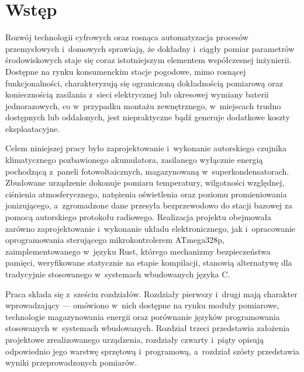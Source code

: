 \documentclass[a4paper,12pt]{book} %
\renewcommand{\chaptermark}[1]{\markboth{#1}{}}
\begin{document}


\sloppy

\thispagestyle{empty}

\newpage{}



\thispagestyle{empty}

\newpage{}



\tableofcontents{}

\chapter*{Wstęp} %
\chaptermark{Wstęp} %

Rozwój technologii cyfrowych oraz rosnąca automatyzacja procesów
przemysłowych i~domowych sprawiają, że dokładny i~ciągły pomiar
parametrów środowiskowych staje się coraz istotniejszym elementem
współczesnej inżynierii. Dostępne na rynku konsumenckim stacje pogodowe,
mimo rosnącej funkcjonalności, charakteryzują się ograniczoną dokładnością
pomiarową oraz koniecznością zasilania z~sieci elektrycznej lub okresowej
wymiany baterii jednorazowych, co w~przypadku montażu zewnętrznego,
w~miejscach trudno dostępnych lub oddalonych, jest niepraktyczne bądź
generuje dodatkowe koszty eksploatacyjne.
 
Celem niniejszej pracy było zaprojektowanie i~wykonanie autorskiego
czujnika klimatycznego pozbawionego akumulatora, zasilanego wyłącznie
energią pochodzącą z~paneli fotowoltaicznych, magazynowaną
w~superkondensatorach. Zbudowane urządzenie dokonuje pomiaru temperatury,
wilgotności względnej, ciśnienia atmosferycznego, natężenia oświetlenia
oraz poziomu promieniowania jonizującego, a~zgromadzone dane przesyła
bezprzewodowo do stacji bazowej za pomocą autorskiego protokołu radiowego.
Realizacja projektu obejmowała zarówno zaprojektowanie i~wykonanie układu
elektronicznego, jak i~opracowanie oprogramowania sterującego
mikrokontrolerem ATmega328p, zaimplementowanego w~języku Rust, którego
mechanizmy bezpieczeństwa pamięci, weryfikowane statycznie na etapie
kompilacji, stanowią alternatywę dla tradycyjnie stosowanego w~systemach
wbudowanych języka C.
 
Praca składa się z~sześciu rozdziałów. Rozdziały pierwszy i~drugi mają
charakter wprowadzający --- omówiono w~nich dostępne na rynku moduły
pomiarowe, technologie magazynowania energii oraz porównanie języków
programowania stosowanych w~systemach wbudowanych. Rozdział trzeci
przedstawia założenia projektowe zrealizowanego urządzenia, rozdziały
czwarty i~piąty opisują odpowiednio jego warstwę sprzętową i~programową,
a~rozdział szósty przedstawia wyniki przeprowadzonych pomiarów.
\end{document}
